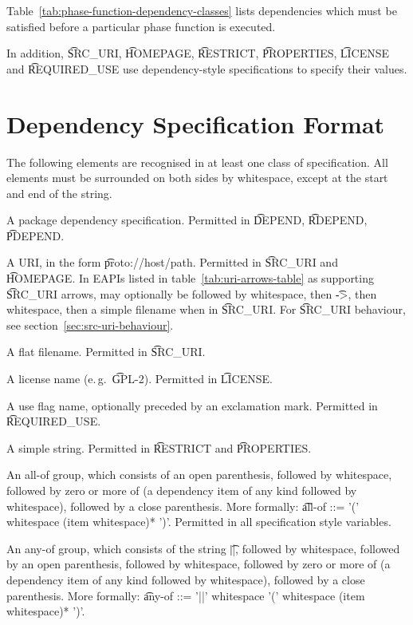 Table~\ref{tab:phase-function-dependency-classes} lists dependencies which must be satisfied before a particular phase function is executed.

In addition, \t{SRC\_URI}, \t{HOMEPAGE}, \t{RESTRICT}, \t{PROPERTIES}, \t{LICENSE} and
\t{REQUIRED\_USE} use dependency-style specifications to specify their values.

\section{Dependency Specification Format}

The following elements are recognised in at least one class of specification. All elements must
be surrounded on both sides by whitespace, except at the start and end of the string.

\begin{compactitem}
\item A package dependency specification. Permitted in \t{DEPEND}, \t{RDEPEND}, \t{PDEPEND}.
\item A URI, in the form \t{proto://host/path}. Permitted in \t{SRC\_URI} and \t{HOMEPAGE}. In EAPIs
    listed in table~\ref{tab:uri-arrows-table} as supporting \t{SRC\_URI} arrows, may optionally be
    followed by whitespace, then \t{->}, then whitespace, then a simple filename when in
    \t{SRC\_URI}.  For \t{SRC\_URI} behaviour, see section~\ref{sec:src-uri-behaviour}.
\item A flat filename. Permitted in \t{SRC\_URI}.
\item A license name (e.\,g.\ \t{GPL-2}). Permitted in \t{LICENSE}.
\item A use flag name, optionally preceded by an exclamation mark. Permitted in \t{REQUIRED\_USE}.
\item A simple string. Permitted in \t{RESTRICT} and \t{PROPERTIES}.
\item An all-of group, which consists of an open parenthesis, followed by whitespace,
    followed by zero or more of (a dependency item of any kind followed by whitespace), followed
    by a close parenthesis. More formally:
    \t{all-of ::= '(' whitespace (item whitespace)* ')'}. Permitted in all specification style
    variables.
\item An any-of group, which consists of the string \t{||}, followed by whitespace,
    followed by an open parenthesis, followed by whitespace, followed by zero or more
    of (a dependency item of any kind followed by whitespace), followed by a close parenthesis.
    More formally: \t{any-of ::= '||' whitespace '(' whitespace (item whitespace)* ')'}.

\end{compactitem}
